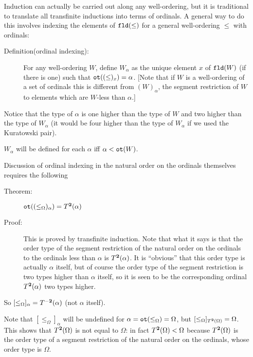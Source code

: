 \documentclass[12pt]{book}
\begin{document}
Induction can actually be carried out along any well-ordering, but it
is traditional to translate all transfinite inductions into terms of
ordinals.  A general way to do this involves indexing the elements of
${\tt fld}(\leq)$ for a general well-ordering $\leq$ with ordinals:

\begin{description}

\item[Definition(ordinal indexing):] For any well-ordering $W$, define
$W_{\alpha}$ as the unique element $x$ of ${\tt fld}(W)$ (if there is
one) such that ${\tt ot}((\leq)_x) = \alpha$.  [Note that if $W$ is a
well-ordering of a set of ordinals this is different from
$(W)_{\alpha}$, the segment restriction of $W$ to elements which are
$W$-less than $\alpha$.]

\end{description}

Notice that the type of $\alpha$ is one higher than the type of $W$
and two higher than the type of $W_{\alpha}$ (it would be four higher
than the type of $W_{\alpha}$ if we used the Kuratowski pair).  

$W_{\alpha}$ will be defined for each $\alpha$ iff $\alpha < {\tt ot}(W)$.

Discussion of ordinal indexing in the natural order on the ordinals
themselves requires the following

\begin{description}

\item[Theorem:]  ${\tt ot}((\leq_{\Omega})_{\alpha}) = T^{\bf 2}(\alpha)$

\item[Proof:] This is proved by transfinite induction.  Note that what
it says is that the order type of the segment restriction of the
natural order on the ordinals to the ordinals less than $\alpha$ is
$T^{\bf 2}(\alpha)$.  It is ``obvious'' that this order type is actually
$\alpha$ itself, but of course the order type of the segment
restriction is two types higher than $\alpha$ itself, so it is seen to be
the corresponding ordinal $T^{\bf 2}(\alpha)$ two types higher. 

\end{description}

So $[\leq_{\Omega}]_{\alpha} = T^{\bf -2}(\alpha)$ (not $\alpha$ itself).

Note that $[\leq_{\Omega}]_{\alpha}$ will be undefined for
$\alpha={\tt ot}(\leq_{\Omega})=\Omega$, but
$[\leq_{\Omega}]_{T^{\bf 2}(\Omega)} = \Omega$.  This shows that
$T^{\bf 2}(\Omega)$ is not equal to $\Omega$: in fact $T^{\bf 2}(\Omega) < \Omega$
because $T^{\bf 2}(\Omega)$ is the order type of a segment restriction of
the natural order on the ordinals, whose order type is $\Omega$.
\end{document}
